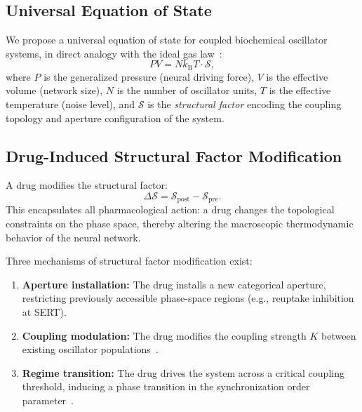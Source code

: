 \documentclass[10pt,twocolumn]{article}
\theoremstyle{definition}
\theoremstyle{remark}
\newcommand{\kB}{k_{\mathrm{B}}}
\begin{document}
\subsection{Universal Equation of State}

We propose a universal equation of state for coupled biochemical
oscillator systems, in direct analogy with the ideal gas
law~\cite{Callen1985}:
\begin{equation}\label{eq:eos}
  PV = N\kB T \cdot \mathcal{S},
\end{equation}
where $P$ is the generalized pressure (neural driving force),
$V$ is the effective volume (network size), $N$ is the number
of oscillator units, $T$ is the effective temperature (noise level),
and $\mathcal{S}$ is the \emph{structural factor} encoding the
coupling topology and aperture configuration of the system.

\subsection{Drug-Induced Structural Factor Modification}

A drug modifies the structural factor:
\begin{equation}
  \boxed{\Delta\mathcal{S} = \mathcal{S}_{\text{post}} - \mathcal{S}_{\text{pre}}.}
\end{equation}
This encapsulates all pharmacological action: a drug changes the
topological constraints on the phase space, thereby altering
the macroscopic thermodynamic behavior of the neural network.

Three mechanisms of structural factor modification exist:
\begin{enumerate}[leftmargin=*]
  \item \textbf{Aperture installation:} The drug installs a new
        categorical aperture, restricting previously accessible
        phase-space regions (e.g., reuptake inhibition at SERT).
  \item \textbf{Coupling modulation:} The drug modifies the
        coupling strength $K$ between existing oscillator
        populations~\cite{Kuramoto1984}.
  \item \textbf{Regime transition:} The drug drives the system
        across a critical coupling threshold, inducing a phase
        transition in the synchronization order
        parameter~\cite{Strogatz2000}.
\end{enumerate}
\end{document}
